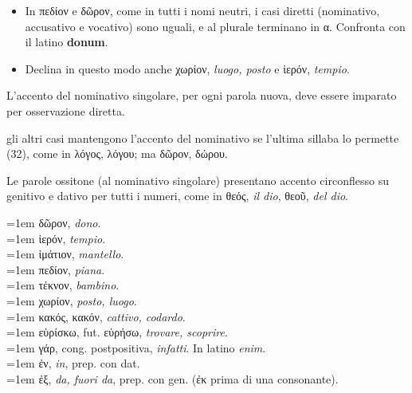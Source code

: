 \documentclass[nols]{tufte-handout}
\newcommand{\didobf}[1]{{\GFSDidotBf #1}}
\newcommand{\textls}[2][5]{%
    \begingroup\addfontfeatures{LetterSpace=#1}#2\endgroup
  }
\renewcommand{\smallcapsspacing}[1]{\textls[10]{#1}}
\renewcommand{\textsc}[1]{\smallcapsspacing{\textsmallcaps{#1}}}
\begin{document}
\begin{itemize}
\item[\textsc{1.}] In \didobf{πεδίον} e \didobf{δῶρον}, come in tutti i nomi neutri, i casi diretti (nominativo, accusativo e vocativo) sono uguali, e al plurale terminano in \didobf{α}. Confronta con il latino \textbf{donum}.  
\item[\textsc{2. Esercizio}] Declina in questo modo anche \didobf{χωρίον}, \textit{luogo, posto} e \didobf{ἱερόν}, \textit{tempio}.
\end{itemize}

 L'accento del nominativo singolare, per ogni parola nuova, deve essere imparato per osservazione diretta.

 gli altri casi mantengono l'accento del nominativo se l'ultima sillaba lo permette (32), come in \didobf{λόγος, λόγου}; ma \didobf{δῶρον, δώρου}.

 Le parole ossitone (al nominativo singolare) presentano accento circonflesso 
su genitivo e dativo per tutti i numeri, come in \didobf{θεός}, \textit{il dio}, \didobf{θεοῦ}, \textit{del dio}.


\begin{multicols}{2}
    \noindent \hangindent=1em \didobf{δῶρον}, \textit{dono}.  \\
    \noindent \hangindent=1em \didobf{ἱερόν}, \textit{tempio}.  \\
    \noindent \hangindent=1em \didobf{ἱμάτιον}, \textit{mantello}.  \\
    \noindent \hangindent=1em \didobf{πεδίον}, \textit{piana}.  \\
    \noindent \hangindent=1em \didobf{τέκνον}, \textit{bambino}.  \\
    \noindent \hangindent=1em \didobf{χωρίον}, \textit{posto, luogo}.  \\
    \noindent \hangindent=1em \didobf{κακός, κακόν}, \textit{cattivo, codardo}.  \\
    \noindent \hangindent=1em \didobf{εὑρίσκω}, fut. \didobf{εὑρήσω}, \textit{trovare, scoprire}.  \\
    \noindent \hangindent=1em \didobf{γάρ}, cong. postpositiva, \textit{infatti}. In latino \textit{enim}.   \\
    \noindent \hangindent=1em \didobf{ἐν}, \textit{in}, prep. con dat.  \\
    \noindent \hangindent=1em \didobf{ἐξ}, \textit{da, fuori da}, prep. con gen. (\didobf{ἐκ} prima di una consonante). \\ 
\end{multicols}
\end{document}
